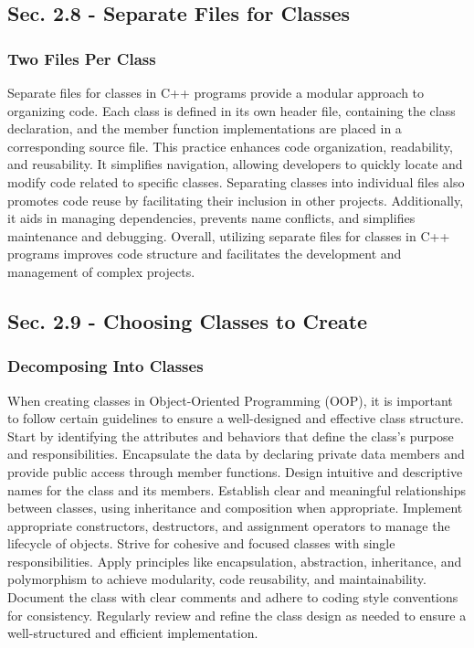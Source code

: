 \subsection*{Sec. 2.8 - Separate Files for Classes}
\subsubsection*{Two Files Per Class}

Separate files for classes in C++ programs provide a modular approach to organizing code. Each class is defined in its own header file, containing the class declaration, and the member function implementations are placed in a corresponding source 
file. This practice enhances code organization, readability, and reusability. It simplifies navigation, allowing developers to quickly locate and modify code related to specific classes. Separating classes into individual files also promotes code 
reuse by facilitating their inclusion in other projects. Additionally, it aids in managing dependencies, prevents name conflicts, and simplifies maintenance and debugging. Overall, utilizing separate files for classes in C++ programs improves code 
structure and facilitates the development and management of complex projects. \\

\subsection*{Sec. 2.9 - Choosing Classes to Create}
\subsubsection*{Decomposing Into Classes}

When creating classes in Object-Oriented Programming (OOP), it is important to follow certain guidelines to ensure a well-designed and effective class structure. Start by identifying the attributes and behaviors that define the class's purpose and 
responsibilities. Encapsulate the data by declaring private data members and provide public access through member functions. Design intuitive and descriptive names for the class and its members. Establish clear and meaningful relationships between 
classes, using inheritance and composition when appropriate. Implement appropriate constructors, destructors, and assignment operators to manage the lifecycle of objects. Strive for cohesive and focused classes with single responsibilities. Apply 
principles like encapsulation, abstraction, inheritance, and polymorphism to achieve modularity, code reusability, and maintainability. Document the class with clear comments and adhere to coding style conventions for consistency. Regularly review 
and refine the class design as needed to ensure a well-structured and efficient implementation. \\

